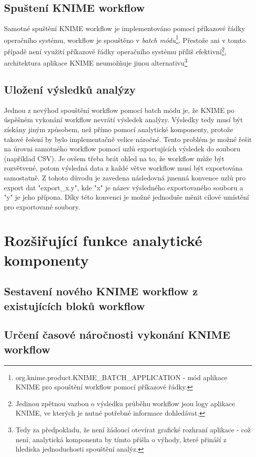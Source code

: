 \documentclass[11pt,twoside,a4paper]{book}
\begin{document}
		\subsection{Spuštení KNIME workflow}
		Samotné spuštění KNIME workflow je implementováno pomocí příkazové řádky operačního systému, workflow je spouštěno v \textit{batch módu}\footnote{org.knime.product.KNIME\_BATCH\_APPLICATION - mód aplikace KNIME pro spouštění workflow pomocí příkazové řádky.}. Přestože ani v tomto případě není využití příkazové řádky operačního systému příliš efektivní\footnote{Jedinou zpětnou vazbou o výsledku průběhu workflow jsou logy aplikace KNIME, ve kterých je nutné potřebné informace dohledávat.}, architektura aplikace KNIME neumožňuje jinou alternativu\footnote{Tedy za předpokladu, že není žádoucí otevírat grafické rozhraní aplikace - což není, analytická komponenta by tímto přišla o výhody, které přináší z hlediska jednoduchosti spouštění analýz.}

		\subsection{Uložení výsledků analýzy}
		Jednou z nevýhod spouštění workflow pomocí batch módu je, že KNIME po úspěšném vykonání workflow nevrátí výsledek analýzy. Výsledky tedy musí být získány jiným způsobem, než přímo pomocí analytické komponenty, protože takové řešení by bylo implementačně velice náročné. Tento problém je možné řešit na úrovni samotného workflow pomocí uzlů exportujících výsledek do souboru (například CSV). Je ovšem třeba brát ohled na to, že workflow může být rozvětvené, potom výsledná data z každé větve workflow musí být exportována samostatně. Z tohoto důvodu je zavedena následovná jmenná konvence uzlů pro export dat "export\_x.y", kde "x" je název výsledného exportovaného souboru a "y" je jeho přípona. Díky této konvenci je možné jednoduše měnit cílové umístění pro exportované soubory.
		 
	\section{Rozšiřující funkce analytické komponenty}
		\subsection{Sestavení nového KNIME workflow z existujících bloků workflow}
		\subsection{Určení časové náročnosti vykonání KNIME workflow}
\end{document}
